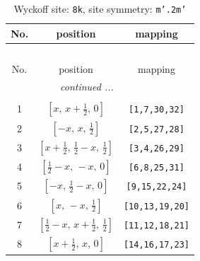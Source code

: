\documentclass[fleqn,8pt]{jsarticle}
\begin{document}
\begin{longtable}{ccc}
\caption{Wyckoff site: {\tt 8k}, site symmetry: {\tt m'.2m'}}
 \\
 \hline \hline
No. & position & mapping \\ \hline \endfirsthead

\multicolumn{2}{l}{\tablename\ \thetable{}} \\
 \hline \hline
No. & position & mapping \\ \hline \endhead

 \hline \hline
\multicolumn{2}{r}{\footnotesize\it continued ...} \\ \endfoot

 \hline \hline
\multicolumn{2}{r}{} \\ \endlastfoot

1 & $\left[ x,\, x + \frac{1}{2},\, 0 \right]$ & {\tt [1,7,30,32]} \\ \hline
2 & $\left[ - x,\, x,\, \frac{1}{2} \right]$ & {\tt [2,5,27,28]} \\ \hline
3 & $\left[ x + \frac{1}{2},\, \frac{1}{2} - x,\, \frac{1}{2} \right]$ & {\tt [3,4,26,29]} \\ \hline
4 & $\left[ \frac{1}{2} - x,\, - x,\, 0 \right]$ & {\tt [6,8,25,31]} \\ \hline
5 & $\left[ - x,\, \frac{1}{2} - x,\, 0 \right]$ & {\tt [9,15,22,24]} \\ \hline
6 & $\left[ x,\, - x,\, \frac{1}{2} \right]$ & {\tt [10,13,19,20]} \\ \hline
7 & $\left[ \frac{1}{2} - x,\, x + \frac{1}{2},\, \frac{1}{2} \right]$ & {\tt [11,12,18,21]} \\ \hline
8 & $\left[ x + \frac{1}{2},\, x,\, 0 \right]$ & {\tt [14,16,17,23]} \\
\end{longtable}
\renewcommand{\arraystretch}{1.2}
\end{document}

